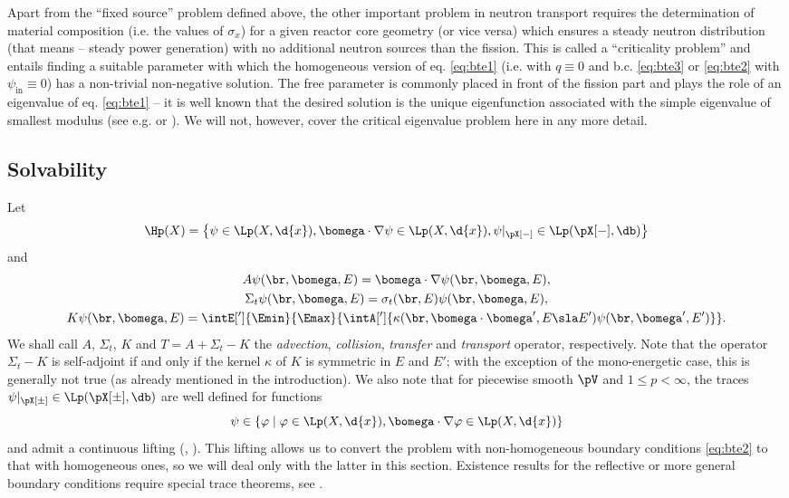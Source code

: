 Apart from the ``fixed source'' problem defined above, the other important problem in neutron transport requires the
determination of material composition (i.e. the values of $\sigma_x$) for a given reactor core geometry (or vice versa)
which ensures a steady neutron distribution (that means -- steady power generation) with no additional neutron sources
than the fission. This is called a ``criticality problem'' and entails finding a suitable parameter with which the
homogeneous version of eq. \eqref{eq:bte1} (i.e. with $q\equiv 0$ and b.c. \eqref{eq:bte3} or \eqref{eq:bte2} with
$\psi_{\text{in}} \equiv 0$) has a non-trivial non-negative solution. The free parameter is commonly placed in front of
the fission part and plays the role of an eigenvalue of eq. \eqref{eq:bte1} -- it is well known that the desired
solution is the unique eigenfunction associated with the simple eigenvalue of smallest modulus (see e.g. \cite[Chap.
XXI, \S3]{DautrayLions} or \cite{Sanchez3}). We will not, however, cover the critical eigenvalue problem here in any
more detail.

\subsection{Solvability}\label{sec:solvability}
Let $$
  \Hp(X) = \left\{\psi\in\Lp(X, \d{x}), \bomega\cdot\nabla\psi\in\Lp(X, \d{x}), \psi\vert_{\pX[-]}\in\Lp(\pX[-],
  \db)\right\}
$$ and
\begin{equation*}
  \begin{gathered}
    A\psi(\br,\bomega,E) = \bomega\cdot\nabla\psi(\br,\bomega,E),\\%
    \Sigma_t\psi(\br,\bomega,E) = \sigma_t(\br,E)\psi(\br,\bomega,E),\\%
    K\psi(\br,\bomega,E) = \intE[']{\Emin}{\Emax}{
            \intA[']{\kappa(\br,\bomega\cdot\bomega',E\sla E')\psi(\br,\bomega',E')}
          }.
  \end{gathered}
\end{equation*}
We shall call $A$, $\Sigma_t$, $K$ and $T = A + \Sigma_t - K$ the \textit{advection}, \textit{collision}, 
\textit{transfer} and \textit{transport} operator, respectively. Note that the operator $\Sigma_t - K$ is self-adjoint
 if and only if the kernel $\kappa$ of $K$ is symmetric in $E$ and $E'$; with the exception of the mono-energetic case, 
 this is generally not true (as already mentioned in the introduction). We also note that for piecewise smooth $\pV$ 
 and $1\leq p < \infty$, the traces $\psi\vert_{\pX[\pm]}\in\Lp(\pX[\pm], \db)$ are well defined for functions 
$$
  \psi\in \{\varphi\mid \varphi\in\Lp(X, \d{x}), \bomega\cdot\nabla\varphi\in\Lp(X, \d{x})\}
$$
and admit a continuous lifting (\cite[Chap. XXI]{DautrayLions}, \cite{Boulanouar1}). This lifting allows us to convert 
the problem with non-homogeneous boundary conditions \eqref{eq:bte2} to that with homogeneous ones, so we will deal only 
with the latter in this section. Existence results for the reflective or more general boundary conditions require 
special trace theorems, see \cite[Chap. XXI, Appendix of \S2]{DautrayLions}.


